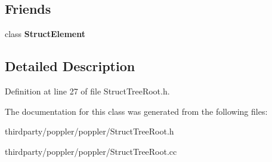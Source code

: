 \subsection*{Friends}
\begin{DoxyCompactItemize}
\item 
\mbox{\label{class_struct_tree_root_a7a4d9df96fb1ef7629bbdf8df0880da9}} 
class {\bfseries Struct\+Element}
\end{DoxyCompactItemize}


\subsection{Detailed Description}


Definition at line 27 of file Struct\+Tree\+Root.\+h.



The documentation for this class was generated from the following files\+:\begin{DoxyCompactItemize}
\item 
thirdparty/poppler/poppler/Struct\+Tree\+Root.\+h\item 
thirdparty/poppler/poppler/Struct\+Tree\+Root.\+cc\end{DoxyCompactItemize}
